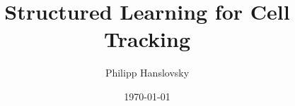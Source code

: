




\title{Structured Learning for Cell Tracking}

\author{Philipp Hanslovsky}
\date{\today}



\maketitle







\appendix %
\setcounter{finalframe}{\value{framenumber}}

% 

\setcounter{framenumber}{\value{finalframe}}





